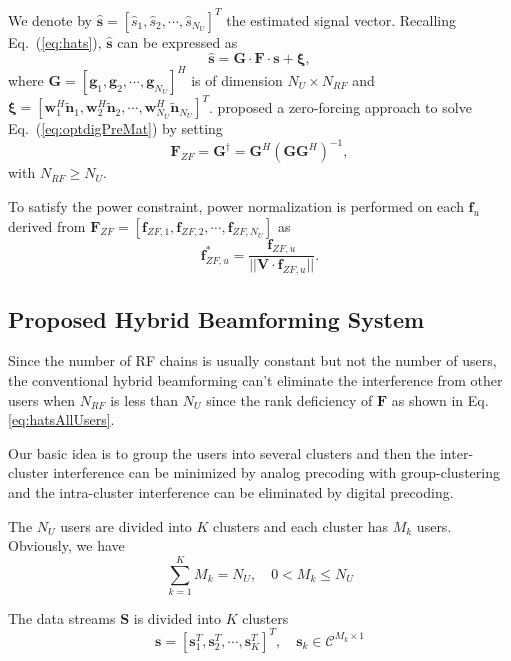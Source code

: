 \documentclass[conference]{IEEEtran}
\begin{document}
We denote by $\hat{\bm s}=\left[\hat{s}_1,\hat{s}_2,\cdots,\hat{s}_{N_U}\right]^T$ the estimated signal vector. Recalling Eq.~(\ref{eq:hats}), $\hat{\bm s}$ can be expressed as \cite{alkhateeb2014channel}
\begin{equation}\label{eq:hatsAllUsers}
\hat{\bm s} = {\bm G}\cdot \bm{F} \cdot\bm{s} + \bm{\xi},
\end{equation}
where ${\bm G}=\left[{\bm g}_1,{\bm g}_2,\cdots,{\bm g}_{N_U}\right]^H$ is of dimension $N_U\times N_{RF}$ and ${\bm \xi}=\left[{\bm w}_1^H\tilde{\bm n}_1,{\bm w}_2^H\tilde{\bm n}_2,\cdots,{\bm w}_{N_U}^H\tilde{\bm n}_{N_U}\right]^T$. \cite{alkhateeb2014channel} proposed a zero-forcing approach to solve Eq.~(\ref{eq:optdigPreMat}) by setting
\begin{equation}\label{eq:ZFU-HBF}
\bm{F}_{ZF}={\bm G}^\dagger = \bm{G}^H(\bm{G}\bm{G}^H)^{-1},
\end{equation}
with $N_{RF}\geq N_U$.

To satisfy the power constraint, power normalization is performed on each ${\bm f}_u$ derived from $\bm{F}_{ZF}=\left[\bm{f}_{ZF,1},\bm{f}_{ZF,2},\cdots,\bm{f}_{ZF,N_U}\right]$ as
\begin{equation}\label{eq:ZFU-HBF2}
\bm{f}^*_{ZF,u} = {\frac{\bm{f}_{ZF,u}}{||\bm{V}\cdot\bm{f}_{ZF,u}||}}.
\end{equation}

\subsection{Proposed Hybrid Beamforming System}
Since the number of RF chains is usually constant but not the number of users, the conventional hybrid beamforming can't eliminate the interference from other users  when $N_{RF}$ is less than $N_U$ since the rank deficiency of $\bm{F}$ as shown in Eq. \eqref{eq:hatsAllUsers}. 

Our basic idea is to group the users into several clusters and then the inter-cluster interference can be minimized by analog precoding with group-clustering and the intra-cluster interference can be eliminated by digital precoding.

The $N_U$ users are divided into $K$ clusters and each cluster has $M_k$ users. Obviously, we have
\begin{equation}
\sum_{k=1}^{K} M_k = N_U, \quad 0< M_k\leq N_U
\end{equation}

The data streams $\bm{S}$ is divided into $K$ clusters
\begin{equation}
\bm{s} = \left[{\mathbf{s}}_1^T, {\mathbf{s}}_2^T,\cdots, \mathbf{s}_{K}^T\right]^T, \quad \mathbf{s}_k\in \mathcal{C}^{M_k\times 1}
\end{equation}
\end{document}
